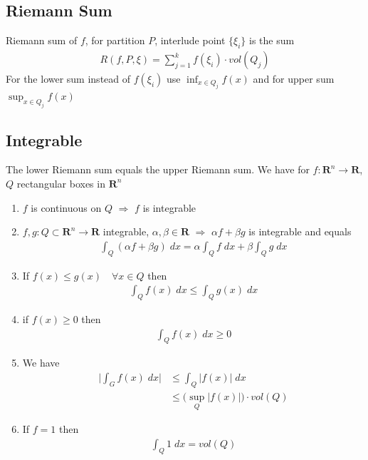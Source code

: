 \documentclass[8pt]{extarticle}
\newcommand{\R}{{\mathbb R}}
\newcommand{\ra}{{\rightarrow}}
\newcommand{\Ra}{{\Rightarrow}}
\def\R{\mathbf{R}}
\begin{document}
\begin{multicols*}{3}
  \subsection{Riemann Sum}
  Riemann sum of $f$, for partition $P$, interlude point $\{\xi_i\}$
  is the sum
  \begin{align*}
    R(f, P, \xi) = \sum_{j = 1}^k f(\xi_i) \cdot vol(Q_j)
  \end{align*}
  For the lower sum instead of $f(\xi_i)$ use $\inf_{x \in Q_j} f(x)$
  and for upper sum $\sup_{x \in Q_j} f(x)$
  \subsection{Integrable}
  The lower Riemann sum equals the upper Riemann sum. We have
  for $f: \R^n \ra \R$, $Q$ rectangular boxes in $\R^n$
  \begin{enumerate}[label=(\arabic*)]
    \item $f$ is continuous on $Q$ $\Ra$ $f$ is integrable
    \item $f, g: Q \subset \R^n \ra \R$ integrable, $\alpha, \beta \in \R$
          $\Ra$ $\alpha f + \beta g$ is integrable and equals
          \begin{align*}
            \int_Q (\alpha f + \beta g) \; dx = \alpha \int_Q f \; dx + \beta \int_Q g \; dx
          \end{align*}
    \item If $f(x) \leq g(x) \quad \forall x \in Q$ then
          \begin{align*}
            \int_Q f(x) \; dx \leq \int_Q g(x) \; dx
          \end{align*}
    \item if $f(x) \geq 0$ then
          \begin{align*}
            \int_Q f(x) \; dx \geq 0
          \end{align*}
    \item We have
          \begin{align*}
            \Big |  \int_G f(x) \; dx  \Big | & \leq \int_Q | f(x) | \; dx                  \\
                                              & \leq \Big( \sup_Q |f(x)| \Big) \cdot vol(Q)
          \end{align*}
    \item If $f = 1$ then
          \begin{align*}
            \int_Q 1 \; dx = vol(Q)
          \end{align*}
  \end{enumerate}

\end{multicols*}
\end{document}
